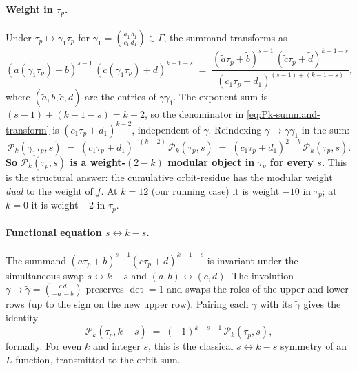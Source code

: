 \documentclass[11pt]{article}
\begin{document}
\paragraph{Weight in $\tau_p$.}
Under $\tau_p \mapsto \gamma_1\tau_p$ for $\gamma_1 = \binom{a_1\,b_1}{c_1\,d_1}
\in \Gamma$, the summand transforms as
\begin{equation}\label{eq:Pk-summand-transform}
  (a(\gamma_1\tau_p) + b)^{s - 1}\,(c(\gamma_1\tau_p) + d)^{k - 1 - s}
  \;=\; \frac{(\tilde a\tau_p + \tilde b)^{s - 1}\,(\tilde c\tau_p + \tilde d)^{k - 1 - s}}{(c_1\tau_p + d_1)^{(s - 1) + (k - 1 - s)}},
\end{equation}
where $(\tilde a, \tilde b, \tilde c, \tilde d)$ are the entries of
$\gamma\gamma_1$.  The exponent sum is $(s - 1) + (k - 1 - s) = k - 2$,
so the denominator in \eqref{eq:Pk-summand-transform} is
$(c_1\tau_p + d_1)^{k - 2}$, independent of $\gamma$.  Reindexing
$\gamma \to \gamma\gamma_1$ in the sum:
\begin{equation}\label{eq:Pk-transform}
  \mathcal{P}_k(\gamma_1\tau_p, s)
  \;=\; (c_1\tau_p + d_1)^{-(k - 2)}\,\mathcal{P}_k(\tau_p, s)
  \;=\; (c_1\tau_p + d_1)^{2 - k}\,\mathcal{P}_k(\tau_p, s).
\end{equation}
\textbf{So $\mathcal{P}_k(\tau_p, s)$ is a weight-$(2 - k)$ modular
object in $\tau_p$ for every $s$.}  This is the structural answer:
the cumulative orbit-residue has the modular weight \emph{dual} to
the weight of $f$.  At $k = 12$ (our running case) it is weight
$-10$ in $\tau_p$; at $k = 0$ it is weight $+2$ in $\tau_p$.

\paragraph{Functional equation $s \leftrightarrow k - s$.}
The summand $(a\tau_p + b)^{s - 1}(c\tau_p + d)^{k - 1 - s}$ is
invariant under the simultaneous swap $s \leftrightarrow k - s$ and
$(a, b) \leftrightarrow (c, d)$.  The involution $\gamma \mapsto
\widetilde\gamma = \binom{c\,d}{-a\,-b}$ preserves $\det = 1$ and swaps
the roles of the upper and lower rows (up to the sign on the new
upper row).  Pairing each $\gamma$ with its $\widetilde\gamma$
gives the identity
\begin{equation}\label{eq:Pk-functional-eq}
  \mathcal{P}_k(\tau_p, k - s)
  \;=\; (-1)^{k - s - 1}\,\mathcal{P}_k(\tau_p, s),
\end{equation}
formally.  For even $k$ and integer $s$, this is the classical
$s \leftrightarrow k - s$ symmetry of an $L$-function, transmitted
to the orbit sum.
\end{document}
